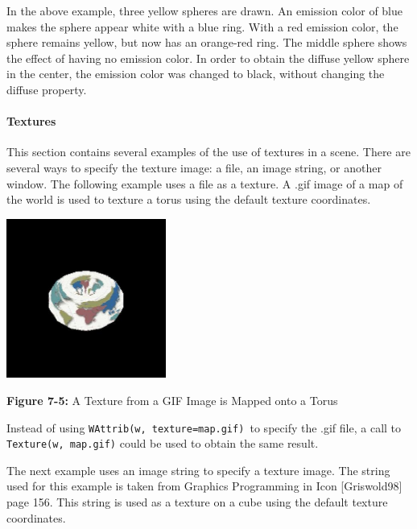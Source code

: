 In the above example, three yellow spheres are drawn. An emission
color of blue makes the sphere appear white with a
blue ring. With a red emission color, the sphere remains yellow, but
now has an orange-red ring. The middle sphere shows the effect of
having no emission color. In order to obtain the diffuse yellow sphere
in the center, the emission color was changed to black, without
changing the diffuse property.

\paragraph{Textures}
This section contains several examples of the use of textures in a
scene. There are several ways to specify the texture image: a file, an
image string, or another window. The following example
uses a file as a texture. A .gif image of a map of the world is used
to texture a torus using the default texture coordinates.

\bigskip

{\centering 
\includegraphics[width=2.0583in,height=2.0583in]{ub-img/ub-img35.jpg}
\par}

{\sffamily\bfseries Figure 7-5:}
{\sffamily A Texture from a GIF Image is Mapped onto a Torus}


Instead of using \texttt{WAttrib(w,
{\textquotedbl}texture=map.gif{\textquotedbl})}\texttt{ }to specify the
.gif file, a call to \texttt{Texture(w,
{\textquotedbl}map.gif{\textquotedbl})} could be used to obtain the
same result.

The next example uses an image string to specify a
texture image. The string used for this example is taken from Graphics
Programming in Icon [Griswold98] page 156. This string is used as a
texture on a cube using the default texture coordinates. 

